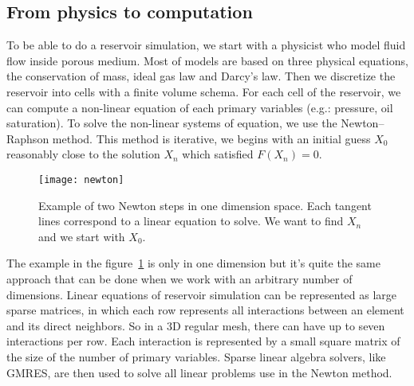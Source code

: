 \subsection{From physics to computation}
To be able to do a reservoir simulation, we start with a physicist who model fluid flow inside porous medium.
%
Most of models are based on three physical equations, the conservation of mass, ideal gas law and Darcy's law.
%
Then we discretize the reservoir into cells with a finite volume schema.
%
For each cell of the reservoir, we can compute a non-linear equation of each primary variables (e.g.: pressure, oil saturation).
%
To solve the non-linear systems of equation, we use the Newton–Raphson method.
%
This method is iterative, we begins with an initial guess $X_0$ reasonably close to the solution $X_n$ which satisfied $F(X_n) = 0$.

\begin{figure}[!ht]
  \centering
  \texttt{[image: newton]}
  \caption{Example of two Newton steps in one dimension space.
    Each tangent lines correspond to a linear equation to solve.
    We want to find $X_n$ and we start with $X_0$.}
\label{fig:newton}
\end{figure}

The example in the figure~\ref{fig:newton} is only in one dimension but it's quite the same approach that can be done when we work with an arbitrary number of dimensions.
%
Linear equations of reservoir simulation can be represented as large sparse matrices, in which each row represents all interactions between an element and its direct neighbors.
%
So in a 3D regular mesh, there can have up to seven interactions per row.
%
Each interaction is represented by a small square matrix of the size of the number of primary variables.
%
Sparse linear algebra solvers, like GMRES, are then used to solve all linear problems use in the Newton method.
